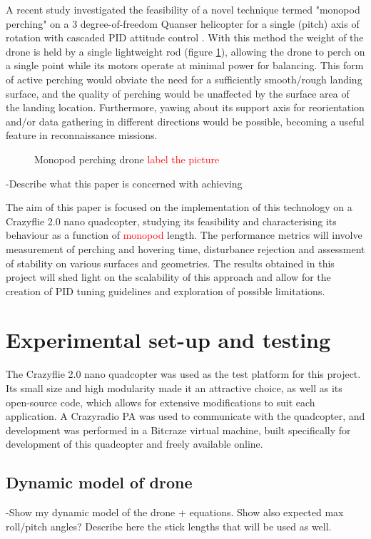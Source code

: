 \documentclass[12pt,a4paper]{article}
\begin{document}
A recent study investigated the feasibility of a novel technique termed "monopod perching" on a 3 degree-of-freedom Quanser helicopter for a single (pitch) axis of rotation with cascaded PID attitude control \cite{Hao}. With this method the weight of the drone is held by a single lightweight rod (figure \ref{fig1}), allowing the drone to perch on a single point while its motors operate at minimal power for balancing. This form of active perching would obviate the need for a sufficiently smooth/rough landing surface, and the quality of perching would be unaffected by the surface area of the landing location. Furthermore, yawing about its support axis for reorientation and/or data gathering in different directions would be possible, becoming a useful feature in reconnaissance missions.

\begin{figure}[h!]
\centering
  \caption{Monopod perching drone \textcolor{red}{label the picture}}
  \label{fig1}
\end{figure}


-Describe what this paper is concerned with achieving


The aim of this paper is focused on the implementation of this technology on a Crazyflie 2.0 nano quadcopter, studying its feasibility and characterising its behaviour as a function of \textcolor{red}{monopod} length. The performance metrics will involve measurement of perching and hovering time, disturbance rejection and assessment of stability on various surfaces and geometries. The results obtained in this project will shed light on the scalability of this approach and allow for the creation of PID tuning guidelines and exploration of possible limitations.


\section{Experimental set-up and testing}
The Crazyflie 2.0 nano quadcopter was used as the test platform for this project. Its small size and high modularity made it an attractive choice, as well as its open-source code, which allows for extensive modifications to suit each application. A Crazyradio PA was used to communicate with the quadcopter, and development was performed in a Bitcraze virtual machine, built specifically for development of this quadcopter and freely available online.
	
\subsection{Dynamic model of drone}
-Show my dynamic model of the drone + equations. Show also expected max roll/pitch angles? Describe here the stick lengths that will be used as well.
\end{document}
